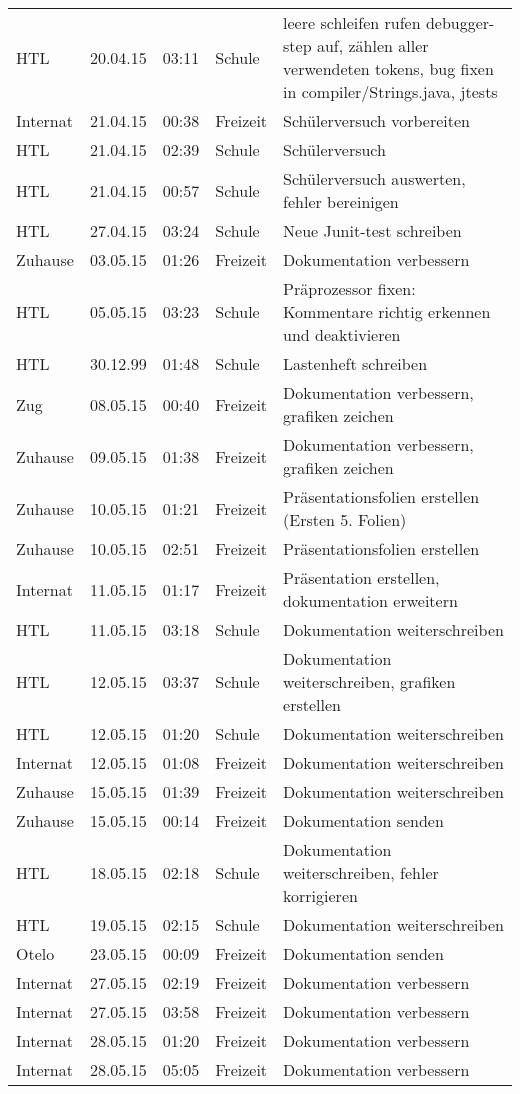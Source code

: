 \begin{small}
\begin{longtable}{ p{} p{} p{} p{} p{}}
HTL	& 20.04.15	& 03:11	& Schule	& leere schleifen rufen debugger-step auf, z\"ahlen aller verwendeten tokens, bug fixen in compiler/Strings.java, jtests \\
Internat	& 21.04.15	& 00:38	& Freizeit	& Sch\"ulerversuch vorbereiten \\
HTL	& 21.04.15	& 02:39	& Schule	& Sch\"ulerversuch \\
HTL	& 21.04.15	& 00:57	& Schule	& Sch\"ulerversuch auswerten, fehler bereinigen \\
HTL	& 27.04.15	& 03:24	& Schule	& Neue Junit-test schreiben \\
Zuhause	& 03.05.15	& 01:26	& Freizeit	& Dokumentation verbessern \\
HTL	& 05.05.15	& 03:23	& Schule	& Pr\"aprozessor fixen: Kommentare richtig erkennen und deaktivieren \\
HTL	& 30.12.99	& 01:48	& Schule	& Lastenheft schreiben \\
Zug	& 08.05.15	& 00:40	& Freizeit	& Dokumentation verbessern, grafiken zeichen \\
Zuhause	& 09.05.15	& 01:38	& Freizeit	& Dokumentation verbessern, grafiken zeichen \\
Zuhause	& 10.05.15	& 01:21	& Freizeit	& Pr\"asentationsfolien erstellen (Ersten 5. Folien) \\
Zuhause	& 10.05.15	& 02:51	& Freizeit	& Pr\"asentationsfolien erstellen \\
Internat	& 11.05.15	& 01:17	& Freizeit	& Pr\"asentation erstellen, dokumentation erweitern \\
HTL	& 11.05.15	& 03:18	& Schule	& Dokumentation weiterschreiben \\
HTL	& 12.05.15	& 03:37	& Schule	& Dokumentation weiterschreiben, grafiken erstellen \\
HTL	& 12.05.15	& 01:20	& Schule	& Dokumentation weiterschreiben \\
Internat	& 12.05.15	& 01:08	& Freizeit	& Dokumentation weiterschreiben \\
Zuhause	& 15.05.15	& 01:39	& Freizeit	& Dokumentation weiterschreiben \\
Zuhause	& 15.05.15	& 00:14	& Freizeit	& Dokumentation senden \\
HTL	& 18.05.15	& 02:18	& Schule	& Dokumentation weiterschreiben, fehler korrigieren \\
HTL	& 19.05.15	& 02:15	& Schule	& Dokumentation weiterschreiben \\
Otelo	& 23.05.15	& 00:09	& Freizeit	& Dokumentation senden \\
Internat	& 27.05.15	& 02:19	& Freizeit	& Dokumentation verbessern \\
Internat	& 27.05.15	& 03:58	& Freizeit	& Dokumentation verbessern \\
Internat	& 28.05.15	& 01:20	& Freizeit	& Dokumentation verbessern \\
Internat	& 28.05.15	& 05:05	& Freizeit	& Dokumentation verbessern \\

 \end{longtable}
\end{small}
\fi

